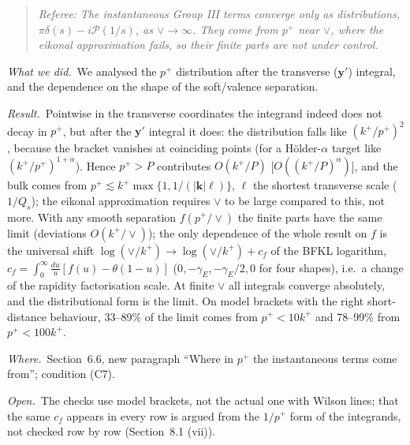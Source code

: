 \documentclass[a4paper,11pt]{article}
\def\v#1{\mathbf{#1}}
\newcommand{\referee}[1]{\begin{quote}\small\emph{Referee:} \emph{#1}\end{quote}}
\newcommand{\done}{\par\noindent\emph{What we did.}\ }
\newcommand{\result}{\par\noindent\emph{Result.}\ }
\newcommand{\where}{\par\noindent\emph{Where.}\ }
\newcommand{\open}{\par\noindent\emph{Open.}\ }
\begin{document}
\referee{The instantaneous Group III terms converge only as distributions, $\pi\delta(s)-i\mathcal P(1/s)$, as $\vee\to\infty$. They come from $p^+$ near $\vee$, where the eikonal approximation fails, so their finite parts are not under control.}
\done We analysed the $p^+$ distribution after the transverse ($\v y'$) integral, and the dependence on the shape of the soft/valence separation.
\result Pointwise in the transverse coordinates the integrand indeed does not decay in $p^+$, but after the $\v y'$ integral it does: the distribution falls like $(k^+/p^+)^2$, because the bracket vanishes at coinciding points (for a H\"older-$\alpha$ target like $(k^+/p^+)^{1+\alpha}$). Hence $p^+>P$ contributes $O(k^+/P)$ [$O((k^+/P)^\alpha)$], and the bulk comes from $p^+\lesssim k^+\max\{1,1/(|\v k|\ell)\}$, $\ell$ the shortest transverse scale ($1/Q_s$); the eikonal approximation requires $\vee$ to be large compared to this, not more. With any smooth separation $f(p^+/\vee)$ the finite parts have the same limit (deviations $O(k^+/\vee)$); the only dependence of the whole result on $f$ is the universal shift $\log(\vee/k^+)\to\log(\vee/k^+)+c_f$ of the BFKL logarithm, $c_f=\int_0^\infty\frac{du}{u}[f(u)-\theta(1-u)]$ ($0,-\gamma_E,-\gamma_E/2,0$ for four shapes), i.e.\ a change of the rapidity factorisation scale. At finite $\vee$ all integrals converge absolutely, and the distributional form is the limit. On model brackets with the right short-distance behaviour, 33--89\% of the limit comes from $p^+<10k^+$ and 78--99\% from $p^+<100k^+$.
\where Section~6.6, new paragraph ``Where in $p^+$ the instantaneous terms come from''; condition (C7).
\open The checks use model brackets, not the actual one with Wilson lines; that the same $c_f$ appears in every row is argued from the $1/p^+$ form of the integrands, not checked row by row (Section~8.1 (vii)).
\end{document}
